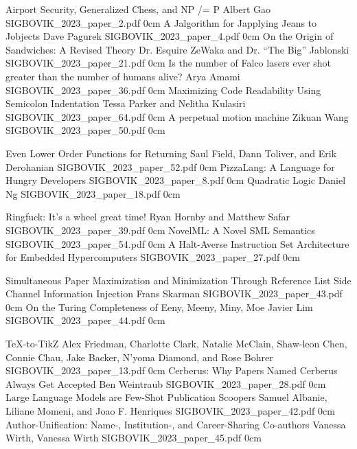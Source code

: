 \addpaper
	{Airport Security, Generalized Chess, and NP /= P}
	{Albert Gao}
	{}
	{SIGBOVIK_2023_paper_2.pdf}
	{0cm}
	{}
\addpaper
	{A Jalgorithm for Japplying Jeans to Jobjects}
	{Dave Pagurek}
	{}
	{SIGBOVIK_2023_paper_4.pdf}
	{0cm}
	{}
\addpaper
	{On the Origin of Sandwiches: A Revised Theory}
	{Dr. Esquire ZeWaka and Dr. ``The Big'' Jablonski}
	{}
	{SIGBOVIK_2023_paper_21.pdf}
	{0cm}
	{}
\addpaper
	{Is the number of Falco lasers ever shot greater than the number of humans alive?}
	{Arya Amami}
	{}
	{SIGBOVIK_2023_paper_36.pdf}
	{0cm}
	{}
\addpaper
	{Maximizing Code Readability Using Semicolon Indentation}
	{Tessa Parker and Nelitha Kulasiri}
	{}
	{SIGBOVIK_2023_paper_64.pdf}
	{0cm}
	{}
\addpaper
	{A perpetual motion machine}
	{Zikuan Wang}
	{}
	{SIGBOVIK_2023_paper_50.pdf}
	{0cm}
	{}


\addpaper
	{Even Lower Order Functions for Returning}
	{Saul Field, Dann Toliver, and Erik Derohanian }
	{}
	{SIGBOVIK_2023_paper_52.pdf}
	{0cm}
	{}
\addpaper
	{PizzaLang: A Language for Hungry Developers}
	{}
	{}
	{SIGBOVIK_2023_paper_8.pdf}
	{0cm}
	{}
\addpaper
	{Quadratic Logic}
	{Daniel Ng}
	{}
	{SIGBOVIK_2023_paper_18.pdf}
	{0cm}
	{}

\addpaper
	{Ringfuck: It's a wheel great time!}
	{Ryan Hornby and Matthew Safar}
	{}
	{SIGBOVIK_2023_paper_39.pdf}
	{0cm}
	{}
\addpaper
	{NovelML: A Novel SML Semantics}
	{}
	{}
	{SIGBOVIK_2023_paper_54.pdf}
	{0cm}
	{}
\addpaper
	{A Halt-Averse Instruction Set Architecture for Embedded Hypercomputers}
	{}
	{}
	{SIGBOVIK_2023_paper_27.pdf}
	{0cm}
	{}

\addpaper
	{Simultaneous Paper Maximization and Minimization Through Reference List Side Channel Information Injection}
	{Frans Skarman}
	{}
	{SIGBOVIK_2023_paper_43.pdf}
	{0cm}
	{}
\addpaper
	{On the Turing Completeness of Eeny, Meeny, Miny, Moe}
	{Javier Lim}
	{}
	{SIGBOVIK_2023_paper_44.pdf}
	{0cm}
	{}


\addpaper
	{TeX-to-TikZ}
	{Alex Friedman, Charlotte Clark, Natalie McClain, Shaw-leon Chen, Connie Chau, Jake Backer, N'yoma Diamond, and Rose Bohrer}
	{}
	{SIGBOVIK_2023_paper_13.pdf}
	{0cm}
	{}
\addpaper
	{Cerberus: Why Papers Named Cerberus Always Get Accepted}
	{Ben Weintraub}
	{}
	{SIGBOVIK_2023_paper_28.pdf}
	{0cm}
	{}
\addpaper
	{Large Language Models are Few-Shot Publication Scoopers}
	{Samuel Albanie, Liliane Momeni, and Joao F. Henriques}
	{}
	{SIGBOVIK_2023_paper_42.pdf}
	{0cm}
	{}
\addpaper
	{Author-Unification: Name-, Institution-, and Career-Sharing Co-authors}
	{Vanessa Wirth, Vanessa Wirth}
	{}
	{SIGBOVIK_2023_paper_45.pdf}
	{0cm}
	{}


